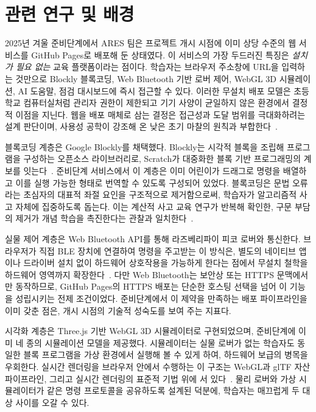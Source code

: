 \section{관련 연구 및 배경}

2025년 겨울 준비단계에서 ARES 팀은 프로젝트 개시 시점에 이미 상당 수준의 웹 서비스를 GitHub Pages로 배포해 둔 상태였다. 이 서비스의 가장 두드러진 특징은 \emph{설치가 필요 없는} 교육 플랫폼이라는 점이다. 학습자는 브라우저 주소창에 URL을 입력하는 것만으로 Blockly 블록코딩, Web Bluetooth 기반 로버 제어, WebGL 3D 시뮬레이션, AI 도움말, 점검 대시보드에 즉시 접근할 수 있다. 이러한 무설치 배포 모델은 초등학교 컴퓨터실처럼 관리자 권한이 제한되고 기기 사양이 균일하지 않은 환경에서 결정적 이점을 지닌다. 웹을 배포 매체로 삼는 결정은 접근성과 도달 범위를 극대화하려는 설계 판단이며, 사용성 공학이 강조해 온 낮은 초기 마찰의 원칙과 부합한다~\cite{nielsen1993usability, krug2014dontmakemethink}.

블록코딩 계층은 Google Blockly를 채택했다. Blockly는 시각적 블록을 조립해 프로그램을 구성하는 오픈소스 라이브러리로, Scratch가 대중화한 블록 기반 프로그래밍의 계보를 잇는다~\cite{blockly, maloney2010scratch}. 준비단계 서비스에서 이 계층은 이미 어린이가 드래그로 명령을 배열하고 이를 실행 가능한 형태로 번역할 수 있도록 구성되어 있었다. 블록코딩은 문법 오류라는 초심자의 대표적 좌절 요인을 구조적으로 제거함으로써, 학습자가 알고리즘적 사고 자체에 집중하도록 돕는다. 이는 계산적 사고 교육 연구가 반복해 확인한, 구문 부담의 제거가 개념 학습을 촉진한다는 관찰과 일치한다~\cite{brennan2012ct, grover2013ct}.

실물 제어 계층은 Web Bluetooth API를 통해 라즈베리파이 피코 로버와 통신한다. 브라우저가 직접 BLE 장치에 연결하여 명령을 주고받는 이 방식은, 별도의 네이티브 앱이나 드라이버 설치 없이 하드웨어 상호작용을 가능하게 한다는 점에서 무설치 철학을 하드웨어 영역까지 확장한다~\cite{webbluetooth, bluetooth54}. 다만 Web Bluetooth는 보안상  또는 HTTPS 문맥에서만 동작하므로, GitHub Pages의 HTTPS 배포는 단순한 호스팅 선택을 넘어 이 기능을 성립시키는 전제 조건이었다. 준비단계에서 이 제약을 만족하는 배포 파이프라인을 이미 갖춘 점은, 개시 시점의 기술적 성숙도를 보여 주는 지표다.

시각화 계층은 Three.js 기반 WebGL 3D 시뮬레이터로 구현되었으며, 준비단계에 이미 네 종의 시뮬레이션 모델을 제공했다. 시뮬레이터는 실물 로버가 없는 학습자도 동일한 블록 프로그램을 가상 환경에서 실행해 볼 수 있게 하여, 하드웨어 보급의 병목을 우회한다. 실시간 렌더링을 브라우저 안에서 수행하는 이 구조는 WebGL과 glTF 자산 파이프라인, 그리고 실시간 렌더링의 표준적 기법 위에 서 있다~\cite{threejs, webgl, gltf, akenine2018realtime}. 물리 로버와 가상 시뮬레이터가 같은 명령 프로토콜을 공유하도록 설계된 덕분에, 학습자는 매끄럽게 두 대상 사이를 오갈 수 있다.

